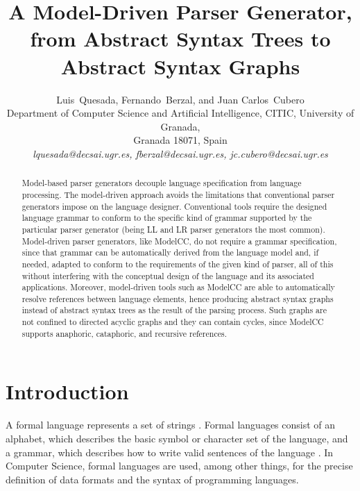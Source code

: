 \documentclass[floatfix,rmp,twocolumn,twoside]{revtex4}
\begin{document}
\title{A Model-Driven Parser Generator, \\
from Abstract Syntax Trees to Abstract Syntax Graphs}
\author{Luis~Quesada, Fernando~Berzal, and Juan Carlos~Cubero\\
  Department of Computer Science and Artificial Intelligence, CITIC, University of Granada, \\
  Granada 18071, Spain \\
  \textit{lquesada@decsai.ugr.es, fberzal@decsai.ugr.es, jc.cubero@decsai.ugr.es}
  }

\begin{abstract}
Model-based parser generators decouple language specification from language processing. The model-driven approach avoids the limitations that conventional parser generators impose on the language designer. Conventional tools require the designed language grammar to conform to the specific kind of grammar supported by the particular parser generator (being  LL and LR parser generators the most common). Model-driven parser generators, like ModelCC, do not require a grammar specification, since that grammar can be automatically derived from the language model and, if needed, adapted to conform to the requirements of the given kind of parser, all of this without interfering with the conceptual design of the language and its associated applications. Moreover, model-driven tools such as ModelCC are able to automatically resolve references between language elements, hence producing abstract syntax graphs instead of abstract syntax trees as the result of the parsing process. Such graphs are not confined to directed acyclic graphs and they can contain cycles, since ModelCC supports anaphoric, cataphoric, and recursive references.
\end{abstract}

\maketitle

\section{Introduction} \label{sec:introduction}
A formal language represents a set of strings \cite{Jurafsky2009}.
Formal languages consist of an alphabet, which describes the basic symbol or character set of the language, and a grammar, which describes how to write valid sentences of the language \cite{Ginsburg1975,Harrison1978}.
In Computer Science, formal languages are used, among other things, for the precise definition of data formats and the syntax of programming languages.
\end{document}

